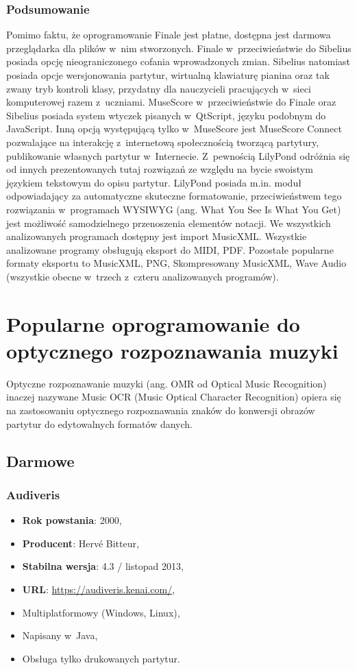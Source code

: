\documentclass[polish,thesis,12pt]{dcsbook}
\begin{document}
\subsubsection{Podsumowanie}
Pomimo faktu, że oprogramowanie Finale jest płatne, dostępna jest darmowa przeglądarka dla plików w~nim stworzonych. Finale w~przeciwieństwie do Sibelius posiada opcję nieograniczonego cofania wprowadzonych zmian. Sibelius natomiast posiada opcje wersjonowania partytur, wirtualną klawiaturę pianina oraz tak zwany tryb kontroli klasy, przydatny dla nauczycieli pracujących w~sieci komputerowej razem z~uczniami. MuseScore w~przeciwieństwie do Finale oraz Sibelius posiada system wtyczek pisanych w~QtScript, języku podobnym do JavaScript. Inną opcją występującą tylko w~MuseScore jest MuseScore Connect pozwalające na interakcję z~internetową społecznością tworzącą partytury, publikowanie własnych partytur w~Internecie. Z~pewnością LilyPond odróżnia się od innych prezentowanych tutaj rozwiązań ze względu na bycie swoistym językiem tekstowym do opisu partytur. LilyPond posiada m.in. moduł odpowiadający za automatyczne skuteczne formatowanie, przeciwieństwem tego rozwiązania w~programach WYSIWYG (ang. What You See Is What You Get) jest możliwość samodzielnego przenoszenia elementów notacji. We wszystkich analizowanych programach dostępny jest import MusicXML. Wszystkie analizowane programy obsługują eksport do MIDI, PDF. Pozostałe popularne formaty eksportu to MusicXML, PNG, Skompresowany MusicXML, Wave Audio (wszystkie obecne w~trzech z~czteru analizowanych programów).

\section{Popularne oprogramowanie do optycznego rozpoznawania muzyki}
Optyczne rozpoznawanie muzyki (ang. OMR od Optical Music Recognition) inaczej nazywane Music OCR (Music Optical Character Recognition) opiera się na zastosowaniu optycznego rozpoznawania znaków do konwersji obrazów partytur do edytowalnych formatów danych.
\subsection{Darmowe}
\subsubsection{Audiveris}
\begin{itemize}
  \item \textbf{Rok powstania}: 2000,
  \item \textbf{Producent}: Hervé Bitteur,
  \item \textbf{Stabilna wersja}: 4.3 / listopad 2013,
  \item \textbf{URL}: \url{https://audiveris.kenai.com/},
  \item Multiplatformowy (Windows, Linux),
  \item Napisany w~Java,
  \item Obsługa tylko drukowanych partytur.
\end{itemize}
\end{document}
